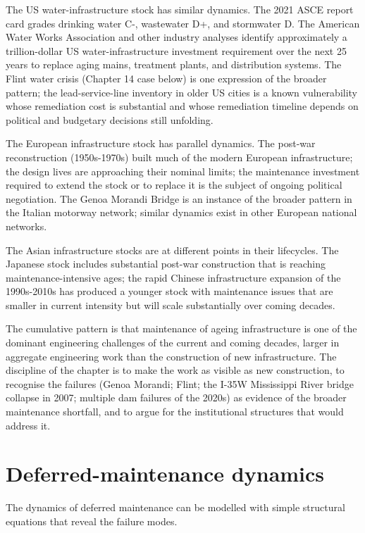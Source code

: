 The US water-infrastructure stock has similar dynamics. The 2021 ASCE report card grades drinking water C-, wastewater D+, and stormwater D. The American Water Works Association and other industry analyses identify approximately a trillion-dollar US water-infrastructure investment requirement over the next 25 years to replace aging mains, treatment plants, and distribution systems. The Flint water crisis (Chapter 14 case below) is one expression of the broader pattern; the lead-service-line inventory in older US cities is a known vulnerability whose remediation cost is substantial and whose remediation timeline depends on political and budgetary decisions still unfolding.

The European infrastructure stock has parallel dynamics. The post-war reconstruction (1950s-1970s) built much of the modern European infrastructure; the design lives are approaching their nominal limits; the maintenance investment required to extend the stock or to replace it is the subject of ongoing political negotiation. The Genoa Morandi Bridge \cite{acc:mit-morandi-2018} is an instance of the broader pattern in the Italian motorway network; similar dynamics exist in other European national networks.

The Asian infrastructure stocks are at different points in their lifecycles. The Japanese stock includes substantial post-war construction that is reaching maintenance-intensive ages; the rapid Chinese infrastructure expansion of the 1990s-2010s has produced a younger stock with maintenance issues that are smaller in current intensity but will scale substantially over coming decades.

The cumulative pattern is that maintenance of ageing infrastructure is one of the dominant engineering challenges of the current and coming decades, larger in aggregate engineering work than the construction of new infrastructure. The discipline of the chapter is to make the work as visible as new construction, to recognise the failures (Genoa Morandi; Flint; the I-35W Mississippi River bridge collapse in 2007; multiple dam failures of the 2020s) as evidence of the broader maintenance shortfall, and to argue for the institutional structures that would address it.

\section{Deferred-maintenance dynamics}

The dynamics of deferred maintenance can be modelled with simple structural equations that reveal the failure modes.

